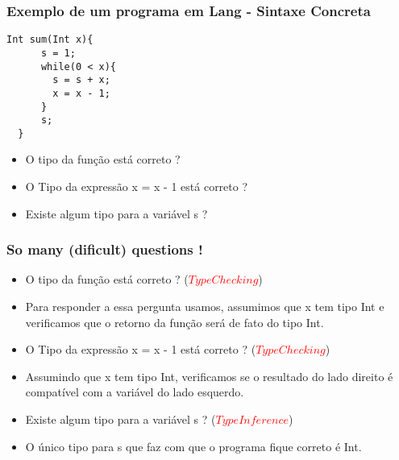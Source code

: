 \documentclass{beamer}
\begin{document}
\begin{frame}[fragile]
   \frametitle{Exemplo de um programa em Lang - Sintaxe Concreta}
\begin{lstlisting}[style=ast,escapechar=@]
  Int sum(Int x){
      s = 1;
      while(0 < x){
        s = s + x;
        x = x - 1;
      }
      s;
  }
\end{lstlisting}
   \begin{itemize}
      \pause
      \item O tipo da função está correto ?
      \pause
      \item O Tipo da expressão x = x - 1 está correto ? 
      \pause
      \item Existe algum tipo para a variável s ? 
   \end{itemize}

\end{frame}

\begin{frame}[fragile]
   \frametitle{So many (dificult) questions !}

   \begin{itemize}
      \item O tipo da função está correto ? (\textcolor{red}{$Type Checking$})
      \item Para responder a essa pergunta usamos, assumimos que x tem tipo Int e verificamos que o retorno da função será de fato do tipo Int.
      \pause
      \item O Tipo da expressão x = x - 1 está correto ? (\textcolor{red}{$Type Checking$}) 
      \item Assumindo que x tem tipo Int, verificamos se o resultado do lado direito é compatível com a variável do lado esquerdo.
      \pause
      \item Existe algum tipo para a variável s ? (\textcolor{red}{$Type Inference$})
      \item O único tipo para s que faz com que o programa fique correto é Int.
   \end{itemize}

\end{frame}
\end{document}
